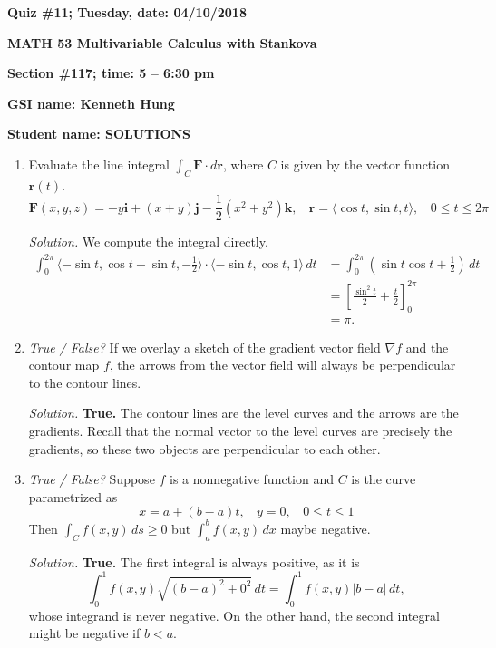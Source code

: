 \documentclass{article}
\newcommand{\ii}{\mathbf{i}}
\newcommand{\jj}{\mathbf{j}}
\newcommand{\kk}{\mathbf{k}}
\begin{document}
{\bf Quiz \#11; Tuesday, date: 04/10/2018}

{\bf MATH 53 Multivariable Calculus with Stankova}

{\bf Section \#117; time: 5 -- 6:30 pm}

{\bf GSI name: Kenneth Hung}

{\bf Student name: SOLUTIONS}

\vspace*{0.25in}

\begin{enumerate}
\item Evaluate the line integral $\int_C \mathbf{F} \cdot d\mathbf{r}$, where $C$ is given by the vector function $\mathbf{r}(t)$.
\[
\mathbf{F}(x, y, z) = -y \ii + (x + y) \jj - \frac{1}{2} (x^2 + y^2) \kk, ~~~~ \mathbf{r} = \langle \cos t, \sin t, t \rangle, ~~~~ 0 \le t \le 2\pi
\]

{\em Solution.} We compute the integral directly.
\begin{align*}
\int_0^{2\pi} \langle -\sin t, \cos t + \sin t, -\frac{1}{2} \rangle \cdot \langle -\sin t, \cos t, 1 \rangle \,dt & = \int_0^{2\pi} \left(\sin t \cos t + \frac{1}{2}\right) \,dt \\
& = \left[\frac{\sin^2 t}{2} + \frac{t}{2} \right]_0^{2\pi} \\
& = \pi.
\end{align*}

\item {\em True / False?} If we overlay a sketch of the gradient vector field $\nabla f$ and the contour map $f$, the arrows from the vector field will always be perpendicular to the contour lines.

{\em Solution.} {\bf True.} The contour lines are the level curves and the arrows are the gradients. Recall that the normal vector to the level curves are precisely the gradients, so these two objects are perpendicular to each other.

\item {\em True / False?} Suppose $f$ is a nonnegative function and $C$ is the curve parametrized as
\[
x = a + (b - a)t, ~~~~ y = 0, ~~~~ 0 \le t \le 1
\]
Then $\int_C f(x, y) \,ds \ge 0$ but $\int_a^b f(x, y) \,dx$ maybe negative.

{\em Solution.} {\bf True.} The first integral is always positive, as it is
\[
\int_0^1 f(x, y) \sqrt{(b-a)^2 + 0^2} \,dt = \int_0^1 f(x, y) |b-a| \,dt,
\]
whose integrand is never negative. On the other hand, the second integral might be negative if $b < a$.
\end{enumerate}
\end{document}

